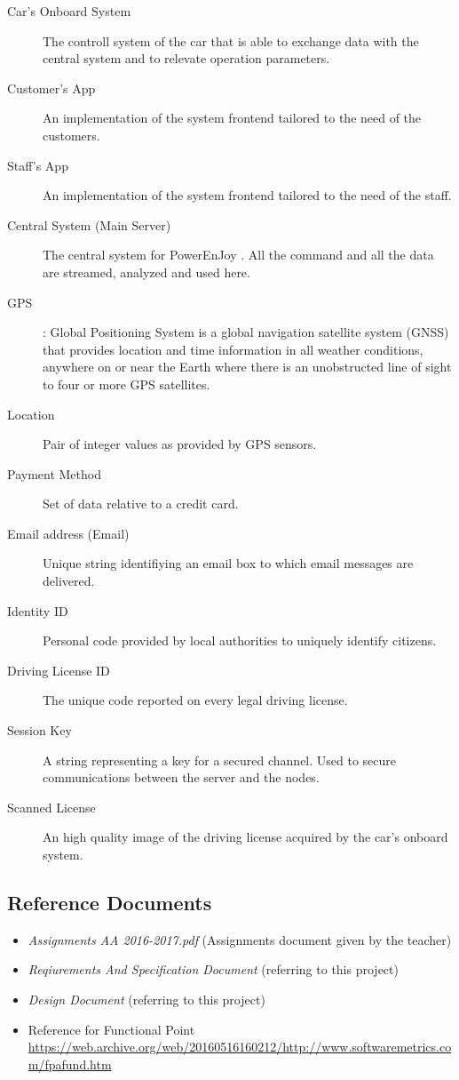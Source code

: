 \documentclass[11pt]{article} %
\newcommand{\pe}{PowerEnJoy }
\begin{document}
\begin{description}
	\item[Car's Onboard System] The controll system of the car that is able to exchange data with the central system and to relevate operation parameters.
	\item[Customer's App] An implementation of the system frontend tailored to the need of the customers.
	\item[Staff's App] An implementation of the system frontend tailored to the need of the staff.
	\item[Central System (Main Server)] The central system for \pe. All the command and all the data are streamed, analyzed and used here.
	\item[GPS]: Global Positioning System is a global navigation satellite system (GNSS) that provides location and time information in all weather conditions, anywhere on or near the Earth where there is an unobstructed line of sight to four or more GPS satellites.
	\item[Location] Pair of integer values as provided by GPS sensors.
	\item[Payment Method] Set of data relative to a credit card.
	\item[Email address (Email)] Unique string identifiying an email box to which email messages are delivered.
	\item[Identity ID] Personal code provided by local authorities to uniquely identify citizens.
	\item[Driving License ID] The unique code reported on every legal driving license.
	\item[Session Key]  A string representing a key for a secured channel. Used to secure communications between the server and the nodes.
	\item[Scanned License] An high quality image of the driving license acquired by the car's onboard system.
  \end{description}

\subsection{Reference Documents}
\begin{itemize}
	\item \textit{Assignments AA 2016-2017.pdf} (Assignments document given by the teacher)
	\item \textit{Reqiurements And Specification Document} (referring to this project)
	\item \textit{Design Document} (referring to this project)
	\item	Reference for Functional Point \url{https://web.archive.org/web/20160516160212/http://www.softwaremetrics.com/fpafund.htm}
  \end{itemize}
\end{document}
